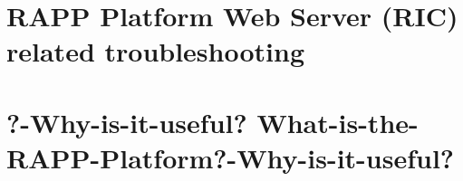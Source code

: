 \documentclass[twoside]{book}
\begin{document}
\chapter{R\-A\-P\-P Platform Web Server (R\-I\-C) related troubleshooting}
\label{md_rapp-platform_8wiki_Troubleshooting-RAPP-Platform-Web-Server}
\hypertarget{md_rapp-platform_8wiki_Troubleshooting-RAPP-Platform-Web-Server}{}

\chapter{?-\/\-Why-\/is-\/it-\/useful? What-\/is-\/the-\/\-R\-A\-P\-P-\/\-Platform?-\/\-Why-\/is-\/it-\/useful?}
\label{md_rapp-platform_8wiki_What-is-the-RAPP-Platform}
\hypertarget{md_rapp-platform_8wiki_What-is-the-RAPP-Platform}{}


\newpage
{}
{}
\printindex
\end{document}
